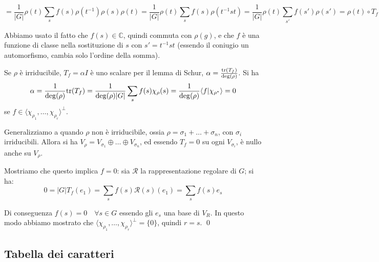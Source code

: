 \documentclass[11pt]{article}
\theoremstyle{plain}
\theoremstyle{definition}
\theoremstyle{remark}
\newcommand{\C}{\mathbb{C}}
\newcommand{\dsum}{\displaystyle\sum}
\newcommand{\tr}{\textnormal{tr}}
\begin{document}
$$= \frac{1}{|G|}\rho(t) \dsum_s f(s) \rho(t^{-1}) \rho(s) \rho(t) = \frac{1}{|G|}\rho(t) \dsum_s f(s) \rho(t^{-1}st) = 
\frac{1}{|G|}\rho(t) \dsum_{s'} f(s') \rho(s')= \rho(t) \circ T_f$$

Abbiamo usato il fatto che $f(s)\in \C$, quindi commuta con $\rho(g)$, e che $f$ è una funzione di classe nella 
sostituzione di $s$ con $s'= t^{-1}st$ (essendo il coniugio un automorfismo, cambia solo l'ordine della somma).

Se $\rho$ è irriducibile, $T_f= \alpha I$ è uno scalare per il lemma di Schur, $\alpha= \frac{\tr(T_f)}{\deg(\rho)}$.
Si ha $$\alpha =\frac{1}{\deg(\rho)}\tr(T_f)=\frac{1}{\deg(\rho)|G|}\dsum_s f(s) \chi_\rho(s)=
\frac{1}{\deg(\rho)} \langle f | \chi_{\rho^*} \rangle = 0$$ se $f \in \langle \chi_{\rho_1}, \ldots, \chi_{\rho_r} \rangle ^{\perp}$.

Generalizziamo a quando $\rho$ non è irriducibile, ossia $\rho = \sigma_1+ \ldots + \sigma_n$, con $\sigma_i$ irriducibili. Allora 
si ha $V_\rho = V_{\sigma_1}  \oplus \ldots \oplus V_{\sigma_n}$, ed essendo $T_f=0 $ su ogni $V_{\sigma_i}$, è nullo anche su $V_\rho$.

Mostriamo che questo implica $f=0$: sia $\mathcal{R}$ la rappresentazione regolare di $G$; si ha:
$$ 0= |G| T_f (e_1) = \dsum_s f(s) \mathcal{R}(s)(e_1) = \dsum_s f(s) e_s $$

Di conseguenza $f(s)=0 \quad \forall s \in G$ essendo gli $e_s$ una base di $V_R$.
In questo modo abbiamo mostrato che $\langle \chi_{\rho_1}, \ldots, \chi_{\rho_r} \rangle ^{\perp} = \{0\}$, quindi $r=s$.
\qed

















\subsection{Tabella dei caratteri}
\end{document}
